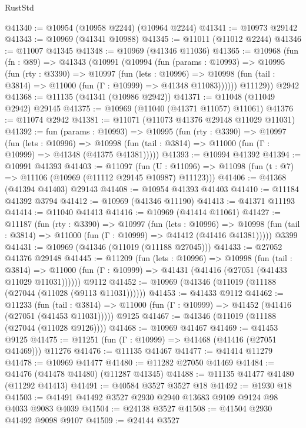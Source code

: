\begin{lexlean}{RustStd}
\begin{coremodule}
@41340 := @10954 (@10958 @2244) (@10964 @2244)
@41341 := @10973 @29142
@41343 := @10969 (@41341 @10988)
@41345 := @11011 (@11012 @2244)
@41346 := @11007 @41345
@41348 := @10969 (@41346 @11036)
@41365 := @10968
    (fun (fn : @89) =>
    @41343
      (@10991
        (@10994
          (fun (params : @10993) =>
          @10995
            (fun (rty : @3390) =>
            @10997
              (fun (lets : @10996) =>
              @10998 (fun (tail : @3814) => @11000 (fun (Γ : @10999) => @41348 @11083))))))
        @11129))
    @2942
@41368 := @11135 (@41341 (@10986 @2942))
@41371 := @11048 (@11049 @2942) @29145
@41375 := @10969 (@11040 (@41371 @11057) @11061)
@41376 := @11074 @2942
@41381 := @11071 (@11073 @41376 @29148 @11029 @11031)
@41392 := fun (params : @10993) =>
  @10995
    (fun (rty : @3390) =>
    @10997
      (fun (lets : @10996) =>
      @10998 (fun (tail : @3814) => @11000 (fun (Γ : @10999) => @41348 (@41375 @41381)))))
@41393 := @10994 @41392
@41394 := @10991 @41393
@41403 := @11097
    (fun (U : @11096) => @11098 (fun (t : @7) => @11106 (@10969 (@11112 @29145 @10987) @11123)))
@41406 := @41368 (@41394 @41403) @29143
@41408 := @10954 @41393 @41403
@41410 := @11184 @41392 @3794
@41412 := @10969 (@41346 @11190)
@41413 := @41371 @11193
@41414 := @11040 @41413
@41416 := @10969 (@41414 @11061)
@41427 := @11187
    (fun (rty : @3390) =>
    @10997
      (fun (lets : @10996) =>
      @10998 (fun (tail : @3814) => @11000 (fun (Γ : @10999) => @41412 (@41416 @41381)))))
    @3399
@41431 := @10969 (@41346 (@11019 (@11188 @27045)))
@41433 := @27052 @41376 @29148
@41445 := @11209
    (fun (lets : @10996) =>
    @10998
      (fun (tail : @3814) =>
      @11000 (fun (Γ : @10999) => @41431 (@41416 (@27051 (@41433 @11029 @11031))))))
    @9112
@41452 := @10969 (@41346 (@11019 (@11188 (@27044 (@11028 (@9113 @11031))))))
@41453 := @41433 @9112
@41462 := @11233
    (fun (tail : @3814) => @11000 (fun (Γ : @10999) => @41452 (@41416 (@27051 (@41453 @11031)))))
    @9125
@41467 := @41346 (@11019 (@11188 (@27044 (@11028 @9126))))
@41468 := @10969 @41467
@41469 := @41453 @9125
@41475 := @11251 (fun (Γ : @10999) => @41468 (@41416 (@27051 @41469))) @11276
@41476 := @11135 @41467
@41477 := @41414 @11279
@41478 := @10969 @41477
@41480 := @11282 @27050 @41469
@41484 := @41476 (@41478 @41480) (@11287 @41345)
@41488 := @11135 @41477 @41480 (@11292 @41413)
@41491 := @40584 @3527 @3527 @18
@41492 := @1930 @18
@41503 := @41491 @41492 @3527 @2930 @2940 @13683 @9109 @9124 @98 @4033 @9083 @4039
@41504 := @24138 @3527
@41508 := @41504 @2930 @41492 @9098 @9107
@41509 := @24144 @3527

\end{coremodule}
\end{lexlean}
